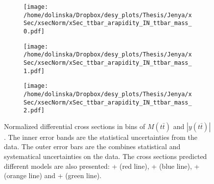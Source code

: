 \begin{figure}[p]
\centering
\begin{subfigure}
  \centering
  \texttt{[image: /home/dolinska/Dropbox/desy\_plots/Thesis/Jenya/xSec/xsecNorm/xSec\_ttbar\_arapidity\_IN\_ttbar\_mass\_0.pdf]}
\end{subfigure}
\begin{subfigure}
  \centering
  \texttt{[image: /home/dolinska/Dropbox/desy\_plots/Thesis/Jenya/xSec/xsecNorm/xSec\_ttbar\_arapidity\_IN\_ttbar\_mass\_1.pdf]}
\end{subfigure}
\begin{subfigure}
  \centering
  \texttt{[image: /home/dolinska/Dropbox/desy\_plots/Thesis/Jenya/xSec/xsecNorm/xSec\_ttbar\_arapidity\_IN\_ttbar\_mass\_2.pdf]}
\end{subfigure}
\caption{Normalized differential cross sections in bins of $M(t\bar{t})$ and $|y(t\bar{t})|$. The inner error bands are the statistical uncertainties from the data.
         The outer error bars are the combines statistical and systematical uncertainties on the data. The cross sections predicted different models are also presented:
         \MG + \PYTHIA (red line), \Powheg + \PYTHIA (blue line), \Powheg + \HERWIG (orange line) and \MCNLO + \HERWIG (green line).}
\label{fig:XS_2D_ytt_Mtt}
\end{figure}

